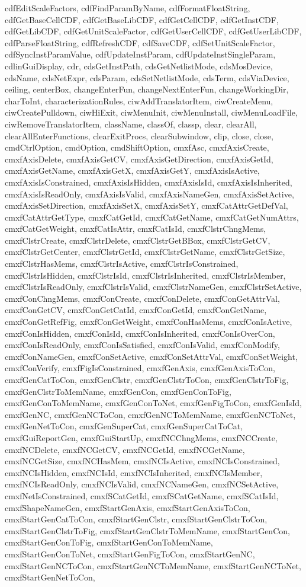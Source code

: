{{cdfEditScaleFactors, cdfFindParamByName, cdfFormatFloatString, cdfGetBaseCellCDF, cdfGetBaseLibCDF, cdfGetCellCDF, cdfGetInstCDF, cdfGetLibCDF, cdfGetUnitScaleFactor, cdfGetUserCellCDF, cdfGetUserLibCDF, cdfParseFloatString, cdfRefreshCDF, cdfSaveCDF, cdfSetUnitScaleFactor, cdfSyncInstParamValue, cdfUpdateInstParam, cdfUpdateInstSingleParam, cdlinGuiDisplay, cdr, cdsGetInstPath, cdsGetNetlistMode, cdsMosDevice, cdsName, cdsNetExpr, cdsParam, cdsSetNetlistMode, cdsTerm, cdsViaDevice, ceiling, centerBox, changeEnterFun, changeNextEnterFun, changeWorkingDir, charToInt, characterizationRules, ciwAddTranslatorItem, ciwCreateMenu, ciwCreatePulldown, ciwHiExit, ciwMenuInit, ciwMenuInstall, ciwMenuLoadFile, ciwRemoveTranslatorItem, className, classOf, classp, clear, clearAll, clearAllEnterFunctions, clearExitProcs, clearSubwindow, clip, close, close, cmdCtrlOption, cmdOption, cmdShiftOption, cmxfAsc, cmxfAxisCreate, cmxfAxisDelete, cmxfAxisGetCV, cmxfAxisGetDirection, cmxfAxisGetId, cmxfAxisGetName, cmxfAxisGetX, cmxfAxisGetY, cmxfAxisIsActive, cmxfAxisIsConstrained, cmxfAxisIsHidden, cmxfAxisIsId, cmxfAxisIsInherited, cmxfAxisIsReadOnly, cmxfAxisIsValid, cmxfAxisNameGen, cmxfAxisSetActive, cmxfAxisSetDirection, cmxfAxisSetX, cmxfAxisSetY, cmxfCatAttrGetDefVal, cmxfCatAttrGetType, cmxfCatGetId, cmxfCatGetName, cmxfCatGetNumAttrs, cmxfCatGetWeight, cmxfCatIsAttr, cmxfCatIsId, cmxfClstrChngMems, cmxfClstrCreate, cmxfClstrDelete, cmxfClstrGetBBox, cmxfClstrGetCV, cmxfClstrGetCenter, cmxfClstrGetId, cmxfClstrGetName, cmxfClstrGetSize, cmxfClstrHasMems, cmxfClstrIsActive, cmxfClstrIsConstrained, cmxfClstrIsHidden, cmxfClstrIsId, cmxfClstrIsInherited, cmxfClstrIsMember, cmxfClstrIsReadOnly, cmxfClstrIsValid, cmxfClstrNameGen, cmxfClstrSetActive, cmxfConChngMems, cmxfConCreate, cmxfConDelete, cmxfConGetAttrVal, cmxfConGetCV, cmxfConGetCatId, cmxfConGetId, cmxfConGetName, cmxfConGetRefFig, cmxfConGetWeight, cmxfConHasMems, cmxfConIsActive, cmxfConIsHidden, cmxfConIsId, cmxfConIsInherited, cmxfConIsOverCon, cmxfConIsReadOnly, cmxfConIsSatisfied, cmxfConIsValid, cmxfConModify, cmxfConNameGen, cmxfConSetActive, cmxfConSetAttrVal, cmxfConSetWeight, cmxfConVerify, cmxfFigIsConstrained, cmxfGenAxis, cmxfGenAxisToCon, cmxfGenCatToCon, cmxfGenClstr, cmxfGenClstrToCon, cmxfGenClstrToFig, cmxfGenClstrToMemName, cmxfGenCon, cmxfGenConToFig, cmxfGenConToMemName, cmxfGenConToNet, cmxfGenFigToCon, cmxfGenIsId, cmxfGenNC, cmxfGenNCToCon, cmxfGenNCToMemName, cmxfGenNCToNet, cmxfGenNetToCon, cmxfGenSuperCat, cmxfGenSuperCatToCat, cmxfGuiReportGen, cmxfGuiStartUp, cmxfNCChngMems, cmxfNCCreate, cmxfNCDelete, cmxfNCGetCV, cmxfNCGetId, cmxfNCGetName, cmxfNCGetSize, cmxfNCHasMem, cmxfNCIsActive, cmxfNCIsConstrained, cmxfNCIsHidden, cmxfNCIsId, cmxfNCIsInherited, cmxfNCIsMember, cmxfNCIsReadOnly, cmxfNCIsValid, cmxfNCNameGen, cmxfNCSetActive, cmxfNetIsConstrained, cmxfSCatGetId, cmxfSCatGetName, cmxfSCatIsId, cmxfShapeNameGen, cmxfStartGenAxis, cmxfStartGenAxisToCon, cmxfStartGenCatToCon, cmxfStartGenClstr, cmxfStartGenClstrToCon, cmxfStartGenClstrToFig, cmxfStartGenClstrToMemName, cmxfStartGenCon, cmxfStartGenConToFig, cmxfStartGenConToMemName, cmxfStartGenConToNet, cmxfStartGenFigToCon, cmxfStartGenNC, cmxfStartGenNCToCon, cmxfStartGenNCToMemName, cmxfStartGenNCToNet, cmxfStartGenNetToCon, }}
